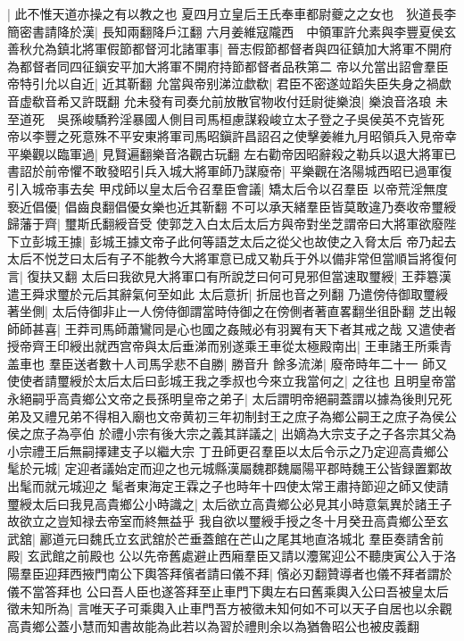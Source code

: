 |{
	此不惟天道亦操之有以教之也}
夏四月立皇后王氏奉車都尉夔之之女也　狄道長李簡密書請降於漢|{
	長知兩翻降戶江翻}
六月姜維寇隴西　中領軍許允素與李豐夏侯玄善秋允為鎮北將軍假節都督河北諸軍事|{
	晉志假節都督者與四征鎮加大將軍不開府為都督者同四征鎭安平加大將軍不開府持節都督者品秩第二}
帝以允當出詔會羣臣帝特引允以自近|{
	近其靳翻}
允當與帝别涕泣歔欷|{
	君臣不密遂竝蹈失臣失身之禍歔音虚欷音希又許既翻}
允未發有司奏允前放散官物收付廷尉徙樂浪|{
	樂浪音洛琅}
未至道死　吳孫峻驕矜淫暴國人側目司馬桓慮謀殺峻立太子登之子吳侯英不克皆死　帝以李豐之死意殊不平安東將軍司馬昭鎭許昌詔召之使擊姜維九月昭領兵入見帝幸平樂觀以臨軍過|{
	見賢遍翻樂音洛觀古玩翻}
左右勸帝因昭辭殺之勒兵以退大將軍已書詔於前帝懼不敢發昭引兵入城大將軍師乃謀廢帝|{
	平樂觀在洛陽城西昭已過軍復引入城帝事去矣}
甲戍師以皇太后令召羣臣會議|{
	矯太后令以召羣臣}
以帝荒淫無度䙝近倡優|{
	倡齒良翻倡優女樂也近其靳翻}
不可以承天緒羣臣皆莫敢違乃奏收帝璽綬歸藩于齊|{
	璽斯氏翻綬音受}
使郭芝入白太后太后方與帝對坐芝謂帝曰大將軍欲廢陛下立彭城王據|{
	彭城王據文帝子此何等語芝太后之從父也故使之入脅太后}
帝乃起去太后不悦芝曰太后有子不能教今大將軍意已成又勒兵于外以備非常但當順旨將復何言|{
	復扶又翻}
太后曰我欲見大將軍口有所說芝曰何可見邪但當速取璽綬|{
	王莽簒漢遣王舜求璽於元后其辭氣何至如此}
太后意折|{
	折屈也音之列翻}
乃遣傍侍御取璽綬著坐側|{
	太后侍御非止一人傍侍御謂當時侍御之在傍側者著直畧翻坐徂卧翻}
芝出報師師甚喜|{
	王莽司馬師蕭鸞同是心也國之姦賊必有羽翼有天下者其戒之哉}
又遣使者授帝齊王印綬出就西宫帝與太后垂涕而别遂乘王車從太極殿南出|{
	王車諸王所乘青盖車也}
羣臣送者數十人司馬孚悲不自勝|{
	勝音升}
餘多流涕|{
	廢帝時年二十一}
師又使使者請璽綬於太后太后曰彭城王我之季叔也今來立我當何之|{
	之往也}
且明皇帝當永絕嗣乎高貴鄉公文帝之長孫明皇帝之弟子|{
	太后謂明帝絕嗣蓋謂以據為後則兄死弟及又禮兄弟不得相入廟也文帝黄初三年初制封王之庶子為鄉公嗣王之庶子為侯公侯之庶子為亭伯}
於禮小宗有後大宗之義其詳議之|{
	出嫡為大宗支子之子各宗其父為小宗禮王后無嗣擇建支子以繼大宗}
丁丑師更召羣臣以太后令示之乃定迎高貴鄉公髦於元城|{
	定迎者議始定而迎之也元城縣漢屬魏郡魏屬陽平郡時魏王公皆録置鄴故出髦而就元城迎之}
髦者東海定王霖之子也時年十四使太常王肅持節迎之師又使請璽綬太后曰我見高貴鄉公小時識之|{
	太后欲立高貴鄉公必見其小時意氣異於諸王子故欲立之豈知禄去帝室而終無益乎}
我自欲以璽綬手授之冬十月癸丑高貴鄉公至玄武舘|{
	酈道元曰魏氏立玄武舘於芒垂蓋館在芒山之尾其地直洛城北}
羣臣奏請舍前殿|{
	玄武館之前殿也}
公以先帝舊處避止西廂羣臣又請以灋駕迎公不聽庚寅公入于洛陽羣臣迎拜西掖門南公下輿答拜儐者請曰儀不拜|{
	儐必刃翻贊導者也儀不拜者謂於儀不當答拜也}
公曰吾人臣也遂答拜至止車門下輿左右曰舊乘輿入公曰吾被皇太后徵未知所為|{
	言唯天子可乘輿入止車門吾方被徵未知何如不可以天子自居也以余觀高貴鄉公蓋小慧而知書故能為此若以為習於禮則余以為猶魯昭公也被皮義翻}
